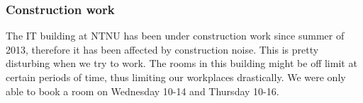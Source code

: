 \subsubsection{Construction work}
The IT building at NTNU has been under construction work since summer of 2013, therefore it has been affected by construction noise. This is pretty disturbing when we try to work. The rooms in this building might be off limit at certain periods of time, thus limiting our workplaces drastically. We were only able to book a room on Wednesday 10-14 and Thursday 10-16.


